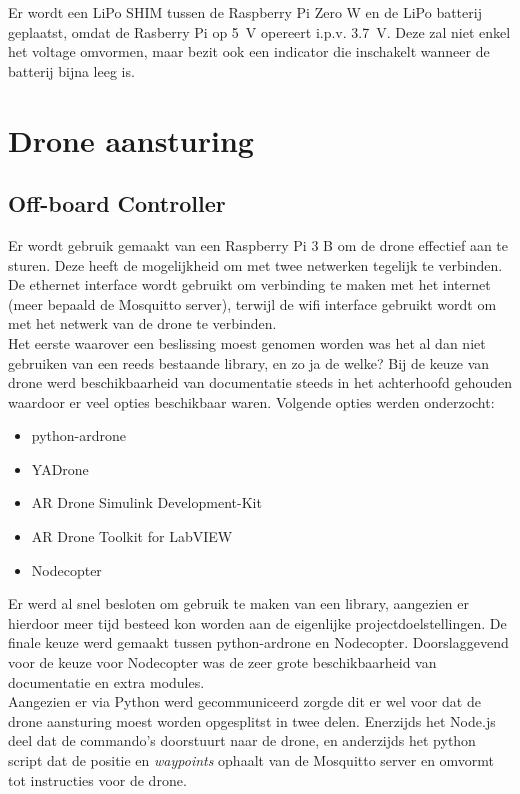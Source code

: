 Er wordt een LiPo SHIM tussen de Raspberry Pi Zero W en de LiPo batterij geplaatst, omdat de Rasberry Pi op \SI{5}{\V} opereert i.p.v. \SI{3.7}{\V}.
Deze zal niet enkel het voltage omvormen, maar bezit ook een indicator die inschakelt wanneer de batterij bijna leeg is.

\section{Drone aansturing} \label{sec:drone_control}
\subsection{Off-board Controller} \label{sec:offboard_controller}
Er wordt gebruik gemaakt van een Raspberry Pi 3 B om de drone effectief aan te sturen.
Deze heeft de mogelijkheid om met twee netwerken tegelijk te verbinden.
De ethernet interface wordt gebruikt om verbinding te maken met het internet (meer bepaald de Mosquitto server), terwijl de wifi interface gebruikt wordt om met het netwerk van de drone te verbinden.\\

Het eerste waarover een beslissing moest genomen worden was het al dan niet gebruiken van een reeds bestaande library, en zo ja de welke? Bij de keuze van drone werd beschikbaarheid van documentatie steeds in het achterhoofd gehouden waardoor er veel opties beschikbaar waren. Volgende opties werden onderzocht:
\begin{itemize}
\item python-ardrone
\item YADrone
\item AR Drone Simulink Development-Kit
\item AR Drone Toolkit for LabVIEW
\item Nodecopter
\end{itemize}

Er werd al snel besloten om gebruik te maken van een library, aangezien er hierdoor meer tijd besteed kon worden aan de eigenlijke projectdoelstellingen. De finale keuze werd gemaakt tussen python-ardrone en Nodecopter. Doorslaggevend voor de keuze voor Nodecopter was de zeer grote beschikbaarheid van documentatie en extra modules.\\

Aangezien er via Python werd gecommuniceerd zorgde dit er wel voor dat de drone aansturing moest worden opgesplitst in twee delen. Enerzijds het Node.js deel dat de commando's doorstuurt naar de drone, en anderzijds het python script dat de positie en \textit{waypoints} ophaalt van de Mosquitto server en omvormt tot instructies voor de drone.

